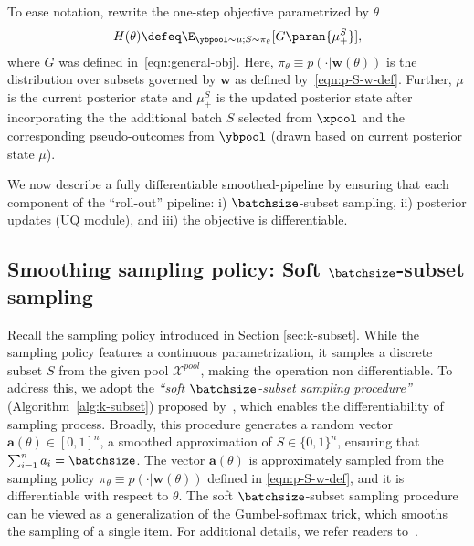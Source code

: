 To ease notation, rewrite the one-step objective parametrized by $\theta$ 
\begin{align}
   H(\theta) \defeq \E_{{\ybpool \sim \mu; S \sim \pi_\theta }}  [G\paran{\mu_+^S}],
  \label{eqn:obj-original-unsmoothed}
\end{align} 
where $G$ was defined in~\eqref{eqn:general-obj}. Here, $\pi_\theta \equiv p(\cdot|\bm{w}(\theta))$ is the distribution over subsets governed by $\bm{w}$ as defined by~\eqref{eqn:p-S-w-def}. Further, $\mu$ is the current posterior state and $\mu_+^S$ is the updated posterior state after incorporating the the additional batch  $S$ selected from $\xpool$ and the corresponding pseudo-outcomes from $\ybpool$ (drawn based on current posterior state $\mu$).


We now describe a fully differentiable smoothed-pipeline by ensuring that each component of the ``roll-out'' pipeline: i) $\batchsize$-subset sampling, ii) posterior updates (UQ module), and iii) the objective is differentiable. 



\subsection{Smoothing sampling policy: Soft $\batchsize$-subset sampling} 



Recall the sampling policy introduced in Section \ref{sec:k-subset}. While the sampling policy features a continuous parametrization, it samples a discrete subset $S$ from the given pool $\mathcal{X}^{pool}$, making the operation non differentiable.  To address this, we adopt the \textit{``soft $\batchsize$-subset sampling procedure''} (Algorithm~\ref{alg:k-subset})  proposed by~\citet{XieEr19}, which enables the differentiability of sampling process. Broadly, this procedure  generates a random vector 
$\bm{a}(\theta) \in [0,1]^n$, a smoothed approximation of $S \in \{0,1\}^n$,  ensuring that $\sum_{i=1}^{n}a_i = \batchsize$. The vector  $\bm{a}({\theta})$ is approximately sampled from the sampling policy $ \pi_{\theta} \equiv p(\cdot|\bm{w}(\theta))$ defined in \eqref{eqn:p-S-w-def}, and it is differentiable with respect to $\theta$. The soft $\batchsize$-subset sampling procedure can be viewed as a generalization of the Gumbel-softmax trick, which smooths the sampling of a single item. For additional details, we refer readers to~\citep{XieEr19}.



